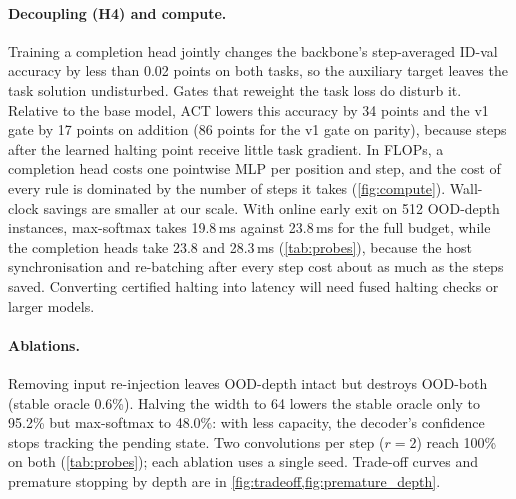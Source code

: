 \paragraph{Decoupling (H4) and compute.} Training a completion head jointly changes the backbone's
step-averaged ID-val accuracy by less than 0.02 points on both tasks, so the auxiliary target leaves the
task solution undisturbed. Gates that reweight the task loss do disturb it. Relative to the base model,
ACT lowers this accuracy by 34 points and the v1 gate by 17 points on addition (86 points for the v1 gate
on parity), because steps after the learned halting point receive little task gradient. In FLOPs, a
completion head costs one pointwise MLP per position and step, and the cost of every rule is dominated
by the number of steps it takes (\cref{fig:compute}). Wall-clock savings are smaller at our scale. With
online early exit on 512 OOD-depth instances, max-softmax takes 19.8\,ms against 23.8\,ms for the full
budget, while the completion heads take 23.8 and 28.3\,ms (\cref{tab:probes}), because the host
synchronisation and re-batching after every step cost about as much as the steps saved. Converting
certified halting into latency will need fused halting checks or larger models.

\paragraph{Ablations.} Removing input re-injection leaves OOD-depth intact but destroys OOD-both (stable
oracle 0.6\%). Halving the width to 64 lowers the stable oracle only to 95.2\% but max-softmax to 48.0\%:
with less capacity, the decoder's confidence stops tracking the pending state. Two convolutions per step
($r=2$) reach 100\% on both (\cref{tab:probes}); each ablation uses a single seed. Trade-off curves
and premature stopping by depth are in \cref{fig:tradeoff,fig:premature_depth}.
